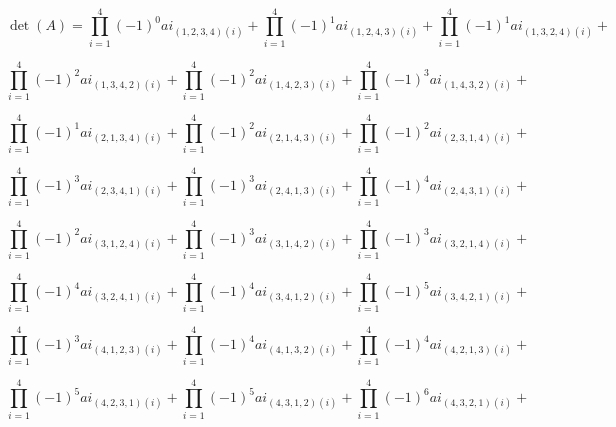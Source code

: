 \documentclass[12pt]{article}
\begin{document}
\newpage

\paragraph{}
    $$\operatorname{det}(A)= \prod_{i=1}^{4} (-1)^0  ai_{(1, 2, 3, 4) (i)} + 
    \prod_{i=1}^{4} (-1)^1  ai_{(1, 2, 4, 3) (i)} +
    \prod_{i=1}^{4} (-1)^1  ai_{(1, 3, 2, 4) (i)} +$$
    
    $$\prod_{i=1}^{4} (-1)^2  ai_{ (1, 3, 4, 2) (i)} + 
    \prod_{i=1}^{4} (-1)^2  ai_{ (1, 4, 2, 3) (i)} +
    \prod_{i=1}^{4} (-1)^3  ai_{ (1, 4, 3, 2) (i)} +$$
    
    $$\prod_{i=1}^{4} (-1)^1  ai_{(2, 1, 3, 4) (i)} + 
    \prod_{i=1}^{4} (-1)^2  ai_{(2, 1, 4, 3) (i)} +
    \prod_{i=1}^{4} (-1)^2  ai_{(2, 3, 1, 4) (i)} +$$
    
    $$\prod_{i=1}^{4} (-1)^3  ai_{(2, 3, 4, 1) (i)} + 
    \prod_{i=1}^{4} (-1)^3  ai_{(2, 4, 1, 3) (i)} +
    \prod_{i=1}^{4} (-1)^4  ai_{(2, 4, 3, 1) (i)} +$$
    
    $$\prod_{i=1}^{4} (-1)^2  ai_{(3, 1, 2, 4) (i)} + 
    \prod_{i=1}^{4} (-1)^3  ai_{(3, 1, 4, 2) (i)} +
    \prod_{i=1}^{4} (-1)^3  ai_{(3, 2, 1, 4) (i)} +$$
    
    $$\prod_{i=1}^{4} (-1)^4  ai_{(3, 2, 4, 1) (i)} + 
    \prod_{i=1}^{4} (-1)^4  ai_{(3, 4, 1, 2) (i)} +
    \prod_{i=1}^{4} (-1)^5  ai_{(3, 4, 2, 1)(i)} +$$
    
    $$\prod_{i=1}^{4} (-1)^3  ai_{(4, 1, 2, 3) (i)} + 
    \prod_{i=1}^{4} (-1)^4  ai_{(4, 1, 3, 2) (i)} +
    \prod_{i=1}^{4} (-1)^4  ai_{(4, 2, 1, 3) (i)} +$$
    
    $$\prod_{i=1}^{4} (-1)^5  ai_{(4, 2, 3, 1) (i)} + 
    \prod_{i=1}^{4} (-1)^5  ai_{(4, 3, 1, 2) (i)} +
    \prod_{i=1}^{4} (-1)^6  ai_{(4, 3, 2, 1) (i)} +$$

\newpage


\end{document}
